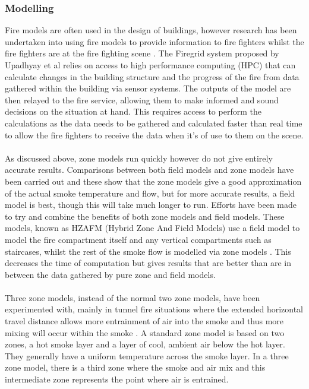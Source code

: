 \documentclass[table,a4paper,oneside]{book}
\begin{document}
\subsubsection{Modelling}
Fire models are often used in the design of buildings, however research has been undertaken into using fire models to provide information to fire fighters whilst the fire fighters are at the fire fighting scene \citep{Upadhyay2008}. The Firegrid system proposed by Upadhyay et al relies on access to high performance computing (HPC) that can calculate  changes in the building structure and the progress of the fire from data gathered within the building via sensor systems. The outputs of the model are then relayed to the fire service, allowing them to make informed and sound decisions on the situation at hand.  This requires access to perform the calculations as the data needs to be gathered and calculated faster than real time to allow the fire fighters to receive the data when it's of use to them on the scene.
\\
\\
As discussed above, zone models run quickly however do not give entirely accurate results.  Comparisons between both field models and zone models have been carried out \citep{Chow1995337} and these show that the zone models give a good approximation of the actual smoke temperature and flow, but for more accurate results,  a field model is best, though this will take much longer to run. Efforts have been made to try and combine the benefits of both zone models and field models. These models, known as HZAFM (Hybrid Zone And Field Models) use a field model to model the fire compartment itself and any vertical compartments such as staircases, whilst the rest of the smoke flow is modelled via zone models \citep{Hua200599}. This decreases the time of computation but gives results that are better than are in between the data gathered by pure zone and field models.
\\
\\
Three zone models, instead of the normal two zone models, have been experimented with, mainly in tunnel fire situations where the extended horizontal travel distance allows more entrainment of air into the smoke and thus more mixing will occur within the smoke \citep{Charters1994}. A standard zone model is based on two zones, a hot smoke layer and a layer of cool, ambient air below the hot layer. They generally have a uniform temperature across the smoke layer. In a three zone model, there is a third zone where the smoke and air mix and this intermediate zone represents the point where air is entrained.
\end{document}
